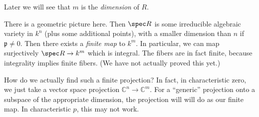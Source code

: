 Later we will see that $m$ is the \emph{dimension} of $R$.

There is a geometric picture here. Then $\spec R$ is some irreducible algebraic
variety in $k^n$ (plus some additional points), with a smaller dimension than
$n$ if $\mathfrak{p} \neq 0$. Then there exists a \emph{finite map} to $k^m$.
In particular, we can map surjectively $\spec R \to k^m$ which is integral.
The fibers are in fact finite, because integrality implies finite fibers.  (We
have not actually proved this yet.)

How do we actually find such a finite projection? In fact, in characteristic
zero, we just take a
vector space projection $\mathbb{C}^n \to \mathbb{C}^m$. For a ``generic''
projection onto a subspace of the appropriate dimension, the projection will 
will do as our finite map. In characteristic $p$, this may not work.

